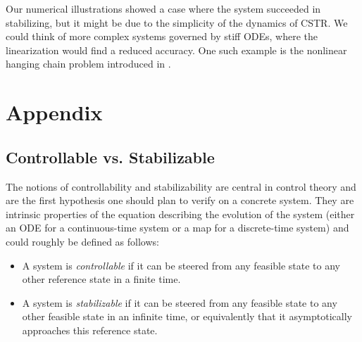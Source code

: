 \documentclass[12pt]{article}
\begin{document}
Our numerical illustrations showed a case where the system succeeded in stabilizing, but it might be due to the simplicity of the dynamics of CSTR.
We could think of more complex systems governed by stiff ODEs, where the linearization would find a reduced accuracy.
One such example is the nonlinear hanging chain problem introduced in \cite{hanging-chain}.

\newpage

\section{Appendix}

\subsection{Controllable vs. Stabilizable}\label{sec:controllability-stabilizability}

The notions of controllability and stabilizability are central in control theory and are the first hypothesis one should plan to verify on a concrete system.
They are intrinsic properties of the equation describing the evolution of the system (either an ODE for a continuous-time system or a map for a discrete-time system) and could roughly be defined as follows:
\begin{itemize}[label=\textbullet]
	\item A system is \textit{controllable} if it can be steered from any feasible state to any other reference state in a finite time.
	\item A system is \textit{stabilizable} if it can be steered from any feasible state to any other feasible state in an infinite time, or equivalently that it asymptotically approaches this reference state.
\end{itemize}
\end{document}
